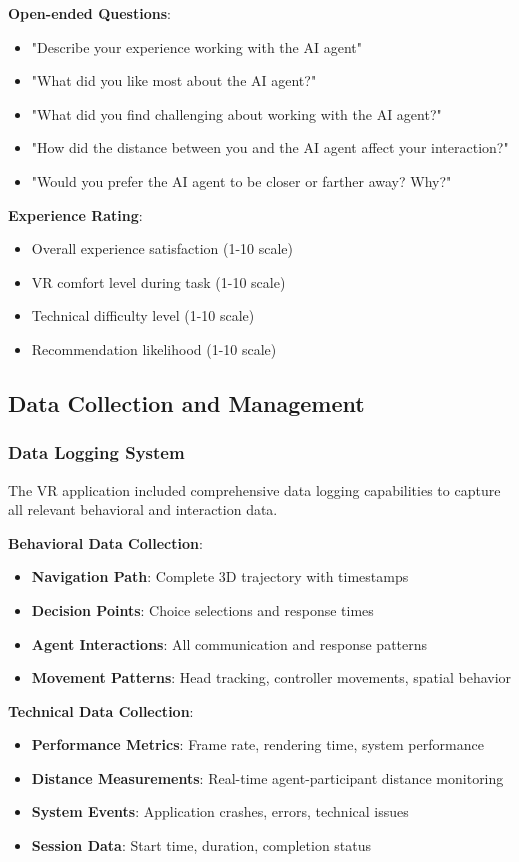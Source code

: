 \documentclass[12pt]{article}
\begin{document}
\textbf{Open-ended Questions}:
\begin{itemize}
    \item "Describe your experience working with the AI agent"
    \item "What did you like most about the AI agent?"
    \item "What did you find challenging about working with the AI agent?"
    \item "How did the distance between you and the AI agent affect your interaction?"
    \item "Would you prefer the AI agent to be closer or farther away? Why?"
\end{itemize}

\textbf{Experience Rating}:
\begin{itemize}
    \item Overall experience satisfaction (1-10 scale)
    \item VR comfort level during task (1-10 scale)
    \item Technical difficulty level (1-10 scale)
    \item Recommendation likelihood (1-10 scale)
\end{itemize}

\subsection{Data Collection and Management}

\subsubsection{Data Logging System}

The VR application included comprehensive data logging capabilities to capture all relevant behavioral and interaction data.

\textbf{Behavioral Data Collection}:
\begin{itemize}
    \item \textbf{Navigation Path}: Complete 3D trajectory with timestamps
    \item \textbf{Decision Points}: Choice selections and response times
    \item \textbf{Agent Interactions}: All communication and response patterns
    \item \textbf{Movement Patterns}: Head tracking, controller movements, spatial behavior
\end{itemize}

\textbf{Technical Data Collection}:
\begin{itemize}
    \item \textbf{Performance Metrics}: Frame rate, rendering time, system performance
    \item \textbf{Distance Measurements}: Real-time agent-participant distance monitoring
    \item \textbf{System Events}: Application crashes, errors, technical issues
    \item \textbf{Session Data}: Start time, duration, completion status
\end{itemize}
\end{document}
